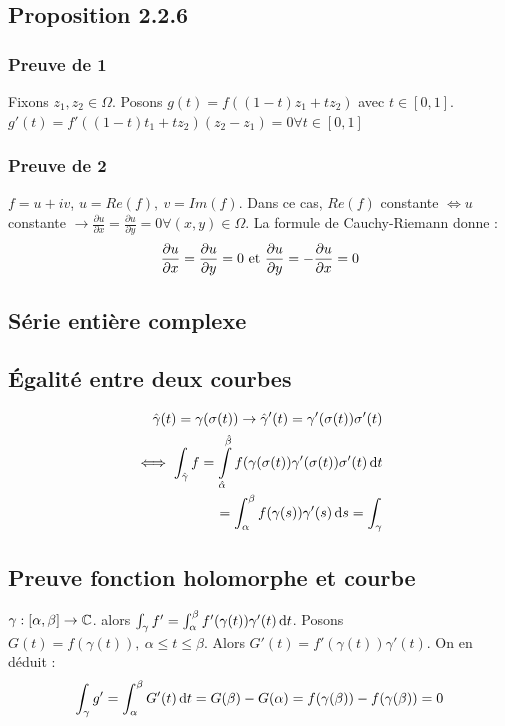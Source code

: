 \documentclass[12pt,a4paper]{article}
\begin{document}
\subsection{Proposition 2.2.6}
\label{app_preuve: proposition 2.2.6}
\subsubsection{Preuve de 1}
Fixons $z_1,z_2 \in \Omega$. Posons $g(t) = f((1-t)z_1 + tz_2)$ avec $t \in [0,1]$.\\
$g'(t) = f'((1-t)t_1 + tz_2)(z_2-z_1) = 0 \forall t \in [0,1]$

\subsubsection{Preuve de 2}
$f = u + iv$, $u = Re(f),\ v = Im(f)$. Dans ce cas, $Re(f)$ constante $\iff u$ constante $\to \frac{\partial u}{\partial x} = \frac{\partial u}{\partial y} = 0 \forall (x,y) \in \Omega$. La formule de Cauchy-Riemann donne :
\[\frac{\partial u}{\partial x} = \frac{\partial u}{\partial y} = 0 \mbox{ et } \frac{\partial u}{\partial y} = -\frac{\partial u}{\partial x} = 0\]

\subsection{Série entière complexe}
\label{app_preuve: theoreme 2.3.2}
       
\subsection{Égalité entre deux courbes}
\label{app_preuve:egalite_courbe_egalite_integ}
\begin{align*}
    \hat{\gamma}(t) = \gamma(\sigma(t)) \to \hat{\gamma}'(t) = \gamma'(\sigma(t))\sigma'(t)\\
    \iff \int_{\hat{\gamma}}^{} f = \int\limits_{\hat{\alpha}}^{\hat{\beta}} f(\gamma(\sigma(t)) \gamma'(\sigma(t)) \sigma'(t) \, \mathrm d t\\
    = \int_{\alpha}^{\beta} f(\gamma(s)) \gamma'(s) \, \mathrm d s = \int_\gamma
\end{align*}

\subsection{Preuve fonction holomorphe et courbe}
\label{app_preuve:prop_2.7.2}
$\gamma : [\alpha, \beta] \to \mathbb{C}$. alors $\int_\gamma f' = \int_{\alpha}^{\beta}f'(\gamma(t)) \gamma'(t) \, \mathrm d t$. Posons $G(t) = f(\gamma(t)),\ \alpha \leq t \leq \beta$. Alors $G'(t) = f'(\gamma(t)) \gamma'(t)$. On en déduit :
\[\int_\gamma g' = \int_{\alpha}^{\beta} G'(t) \, \mathrm d t = G(\beta) - G(\alpha) = f(\gamma(\beta)) - f(\gamma(\beta)) = 0\]
\end{document}
